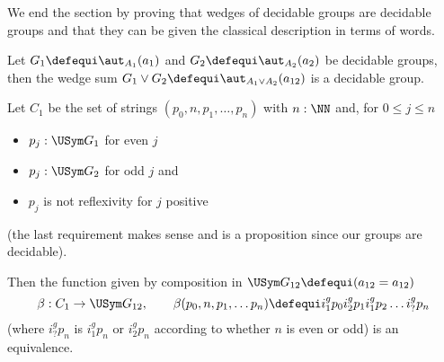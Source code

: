 We end the section by proving that wedges of decidable groups are decidable groups and that they can be given the classical description in terms of words.


\begin{lemma}
  \label{lem:wedgeofgpoidisgpoid}
  Let $G_1\defequi\aut_{A_1}(a_1)$ and $G_2\defequi\aut_{A_2}(a_2)$ be decidable groups, then the wedge sum $G_1\vee G_2\defequi\aut_{A_1\vee A_2}(a_{12})$ is a decidable group.

Let $C_1$ be the set of strings $(p_0,n,p_1,\dots,p_n)$ with $n:\NN$ and, for $0\leq j\leq n$
\begin{itemize}
\item $p_{j}:\USym G_1%
  $  for even $j$
\item $p_{j}:\USym G_2%
  $ for odd $j$ and
\item $p_j$ is not reflexivity for $j$ positive
\end{itemize}
(the last requirement makes sense and is a proposition since our groups are decidable).

  Then the function given by composition in $\USym G_{12}\defequi(a_{12}=a_{12})$
  $$\beta:C_1\to\USym G_{12}%
  ,\qquad\beta(p_0,n,p_1,\dots p_n)\defequi i_1^gp_0i_2^gp_1i_1^gp_2\dots i_?^gp_n$$
(where $i_?^gp_n$  is $i_1^gp_n$ or $i_2^gp_n$ according to whether $n$ is even or odd) is an equivalence.
\end{lemma}
